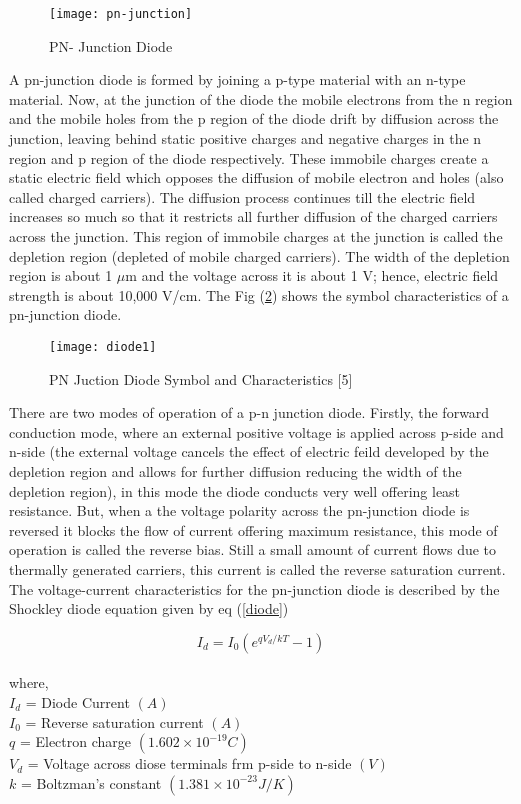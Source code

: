 \begin{figure}[H]
\centering
\texttt{[image: pn-junction]}
\caption{PN- Junction Diode}
\label{figc3h2} %
\end{figure}

A pn-junction diode is formed by joining a p-type material with an n-type material. Now, at the junction of the diode the mobile electrons from the n region and the mobile holes from the p region of the diode drift by diffusion across the junction, leaving behind static positive charges and negative charges in the n region and p region of the diode respectively. These immobile charges create  a static electric field which opposes the diffusion of mobile electron and holes (also called charged carriers). The diffusion process continues till the electric field increases so much so that it restricts all further  diffusion of the charged carriers across the junction. This region of immobile charges at the junction is called the depletion region (depleted of mobile charged carriers). The width of the depletion region is about 1 $\mu \text{m} $ and the voltage across it is about 1 V; hence, electric field strength is about 10,000 V/cm. The Fig (\ref{diode12}) shows the symbol characteristics of a pn-junction diode.

\begin{figure}[H]
\centering
\texttt{[image: diode1]}
\caption{PN Juction Diode Symbol and Characteristics [5]}
\label{diode12} %
\end{figure}

There are two modes of operation of a p-n junction diode. Firstly, the forward conduction mode, where an external positive voltage is applied across p-side and n-side (the external voltage cancels the effect of electric feild developed by the depletion region and allows for further diffusion reducing the width of the depletion region), in this mode the diode conducts very well offering least resistance. But, when a the voltage polarity across the pn-junction diode is reversed it blocks the flow of current offering maximum resistance, this mode of operation is called the reverse bias. Still a small amount of current flows due to thermally generated carriers, this current is called the reverse saturation current. The voltage-current characteristics for the pn-junction diode is described by the Shockley diode equation given by eq (\ref{diode}) 

\begin{equation}
\label{diode}
I_{d} = I_{0}( e^{qV_{d}/kT}-1)
\end{equation}\\
where,\\
$ I_{d} $ = Diode Current $ (A) $ \\
$ I_{0} $ = Reverse saturation current $ (A) $ \\
$ q $ = Electron charge $ (1.602\times10^{-19} C) $ \\
$ V_{d} $ = Voltage across diose terminals frm p-side to n-side $ (V) $ \\
$ k $ = Boltzman's constant $ (1.381\times10^{-23} J/K) $ \\

